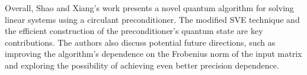 \documentclass[12pt]{extarticle}
\begin{document}
Overall, Shao and Xiang's work presents a novel quantum algorithm for solving linear systems using a circulant preconditioner.
The modified SVE technique and the efficient construction of the preconditioner's quantum state are key contributions.
The authors also discuss potential future directions, such as improving the algorithm's dependence on the Frobenius norm of the input matrix and exploring the possibility of achieving even better precision dependence.

\printbibliography
{}
\end{document}
